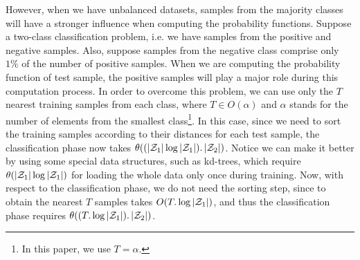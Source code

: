 However, when we have unbalanced datasets, samples from the majority classes will have a stronger influence when computing the probability functions. Suppose a two-class classification problem, i.e. we have samples from the positive and negative samples. Also, suppose samples from the negative class comprise only $1\%$ of the number of positive samples. When we are computing the probability function of test sample, the positive samples will play a major role during this computation process. In order to overcome this problem, we can use only the $T$ nearest training samples from each class, where $T\in O(\alpha)$ and $\alpha$ stands for the number of elements from the smallest class\footnote{In this paper, we use $T=\alpha$.}. In this case, since we need to sort the training samples according to their distances for each test sample, the classification phase now takes $\theta((\left|{\cal Z}_1\right|\log\left|{\cal Z}_1\right|).\left|{\cal Z}_2\right|)$. Notice we can make it better by using some special data structures, such as kd-trees, which require $\theta(\left|{\cal Z}_1\right|\log\left|{\cal Z}_1\right|)$ for loading the whole data only once during training. Now, with respect to the classification phase, we do not need the sorting step, since to obtain the nearest $T$ samples takes $O(T.\log\left|{\cal Z}_1\right|)$, and thus the classification phase requires $\theta((T.\log\left|{\cal Z}_1\right|).\left|{\cal Z}_2\right|)$.